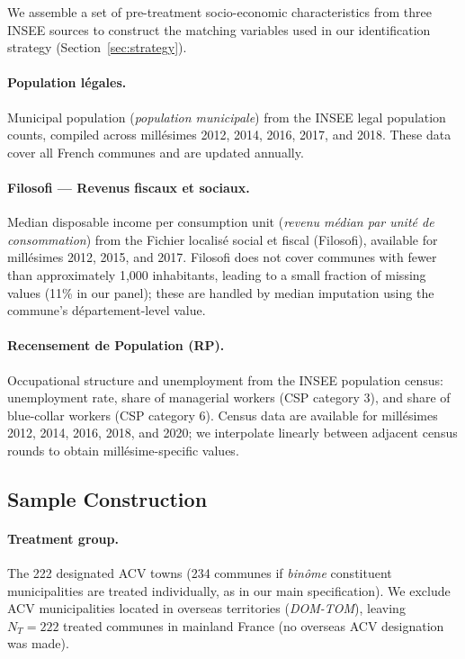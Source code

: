 We assemble a set of pre-treatment socio-economic characteristics from three INSEE sources to construct the matching variables used in our identification strategy (Section~\ref{sec:strategy}).

\paragraph{Population légales.} Municipal population (\textit{population municipale}) from the INSEE legal population counts, compiled across millésimes 2012, 2014, 2016, 2017, and 2018. These data cover all French communes and are updated annually.

\paragraph{Filosofi --- Revenus fiscaux et sociaux.} Median disposable income per consumption unit (\textit{revenu médian par unité de consommation}) from the Fichier localisé social et fiscal (Filosofi), available for millésimes 2012, 2015, and 2017. Filosofi does not cover communes with fewer than approximately 1{,}000 inhabitants, leading to a small fraction of missing values (11\% in our panel); these are handled by median imputation using the commune's département-level value.

\paragraph{Recensement de Population (RP).} Occupational structure and unemployment from the INSEE population census: unemployment rate, share of managerial workers (CSP category 3), and share of blue-collar workers (CSP category 6). Census data are available for millésimes 2012, 2014, 2016, 2018, and 2020; we interpolate linearly between adjacent census rounds to obtain millésime-specific values.

\subsection{Sample Construction}

\paragraph{Treatment group.} The 222 designated ACV towns (234 communes if \textit{binôme} constituent municipalities are treated individually, as in our main specification). We exclude ACV municipalities located in overseas territories (\textit{DOM-TOM}), leaving $N_T = 222$ treated communes in mainland France (no overseas ACV designation was made).

